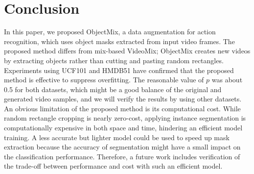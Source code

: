 \begin{table}[t]

\centering
\caption{Summary of the proposed method (fixed to $p=0.6$) and
comparisons of data augmentation (upper rows) with self-supervised methods (lower rows).}
\label{tab:sota_comparison}



\end{table}


\section{Conclusion}

In this paper, we proposed ObjectMix, a data augmentation for action recognition, which uses object masks extracted from input video frames.
The proposed method differs from mix-based VideoMix; ObjectMix creates new videos by extracting objects rather than cutting and pasting random rectangles.
Experiments using UCF101 and HMDB51 have confirmed that the proposed method is effective to suppress overfitting.
The reasonable value of $p$ was about 0.5 for both datasets, which might be a good balance of the original and generated video samples,
and we will verify the results by using other datasets.
An obvious limitation of the proposed method is its computational cost.
While random rectangle cropping is nearly zero-cost,
applying instance segmentation is computationally expensive in both space and time,
hindering an efficient model training.
A less accurate but lighter model could be used to speed up mask extraction
because the accuracy of segmentation might have a small impact on the classification performance.
Therefore, a future work includes verification of the trade-off between performance and cost with such an efficient model.




